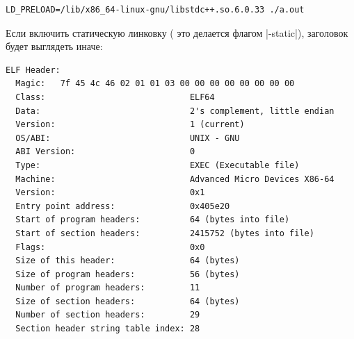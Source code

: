 \documentclass[11pt]{article}
\begin{document}
\begin{lstlisting}
LD_PRELOAD=/lib/x86_64-linux-gnu/libstdc++.so.6.0.33 ./a.out
\end{lstlisting}

Если включить статическую линковку ( это делается флагом \nolint|-static|), заголовок будет выглядеть иначе:

\begin{lstlisting}
ELF Header:
  Magic:   7f 45 4c 46 02 01 01 03 00 00 00 00 00 00 00 00
  Class:                             ELF64
  Data:                              2's complement, little endian
  Version:                           1 (current)
  OS/ABI:                            UNIX - GNU
  ABI Version:                       0
  Type:                              EXEC (Executable file)
  Machine:                           Advanced Micro Devices X86-64
  Version:                           0x1
  Entry point address:               0x405e20
  Start of program headers:          64 (bytes into file)
  Start of section headers:          2415752 (bytes into file)
  Flags:                             0x0
  Size of this header:               64 (bytes)
  Size of program headers:           56 (bytes)
  Number of program headers:         11
  Size of section headers:           64 (bytes)
  Number of section headers:         29
  Section header string table index: 28
\end{lstlisting}
\end{document}
